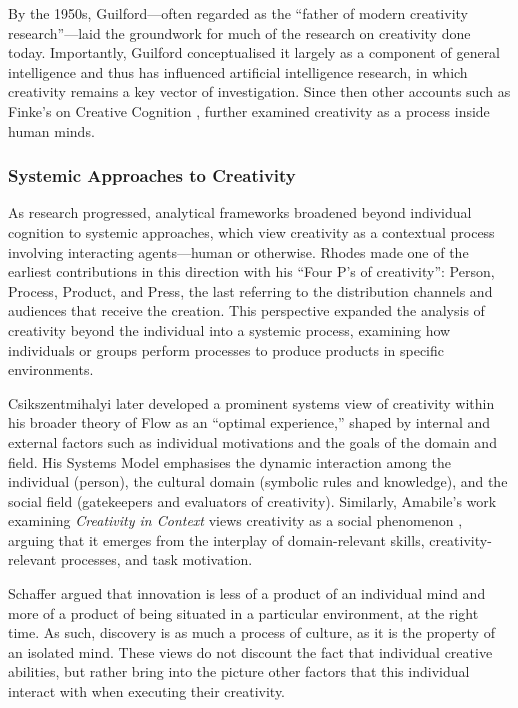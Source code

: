 By the 1950s, Guilford—often regarded as the “father of modern creativity research”—laid the groundwork for much of the research on creativity done today. Importantly, Guilford conceptualised it largely as a component of general intelligence \cite{Guilford1961-rf, Guilford1967-sj, Guilford1956-kt} and thus has influenced artificial intelligence research, in which creativity remains a key vector of investigation. Since then other accounts such as Finke's on Creative Cognition \cite{Finke1992-kh}, further examined creativity as a process inside human minds. 

\subsubsection{Systemic Approaches to Creativity}

As research progressed, analytical frameworks broadened beyond individual cognition to systemic approaches, which view creativity as a contextual process involving interacting agents—human or otherwise. Rhodes \cite{Rhodes1961-od} made one of the earliest contributions in this direction with his “Four P’s of creativity”: Person, Process, Product, and Press, the last referring to the distribution channels and audiences that receive the creation. This perspective expanded the analysis of creativity beyond the individual into a systemic process, examining how individuals or groups perform processes to produce products in specific environments.

Csikszentmihalyi \cite{Csikszentmihalyi1996-qq} later developed a prominent systems view of creativity within his broader theory of Flow as an “optimal experience,” shaped by internal and external factors such as individual motivations and the goals of the domain and field. His Systems Model emphasises the dynamic interaction among the individual (person), the cultural domain (symbolic rules and knowledge), and the social field (gatekeepers and evaluators of creativity). Similarly, Amabile’s work examining \emph{Creativity in Context} views creativity as a social phenomenon \cite{Amabile1983-lj, Amabile1996-pt}, arguing that it emerges from the interplay of domain-relevant skills, creativity-relevant processes, and task motivation.

Schaffer \cite{Schaffer1994-gy} argued that innovation is less of a product of an individual mind and more of a product of being situated in a particular environment, at the right time. As such, discovery is as much a process of culture, as it is the property of an isolated mind. These views do not discount the fact that individual creative abilities, but rather bring into the picture other factors that this individual interact with when executing their creativity. 

